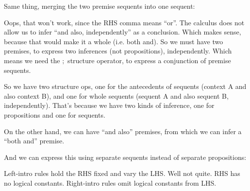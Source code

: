 \documentclass{article}
\begin{document}


Same thing, merging the two premise sequents into one sequent:


Oops, that won't work, since the RHS comma means ``or''. The calculus
does not allow us to infer ``and also, independently'' as a conclusion.
Which makes sense, because that would make it a whole (i.e. both and).
So we must have two premises, to express two inferences (not
propositions), independently. Which means we need the $;$ structure
operator, to express a conjunction of premise sequents.

So we have two structure ops, one for the antecedents of sequents
(context A and also context B), and one for whole sequents (sequent A
and also sequent B, independently). That's because we have two kinds of
inference, one for propositions and one for sequents.

On the other hand, we can have ``and also'' premises, from which we
can infer a ``both and'' premise.


And we can express this using separate sequents instead of separate
propositions:


Left-intro rules hold the RHS fixed and vary the LHS. Well not quite. RHS has no logical constants.  Right-intro rules omit logical constants from LHS.
\end{document}
